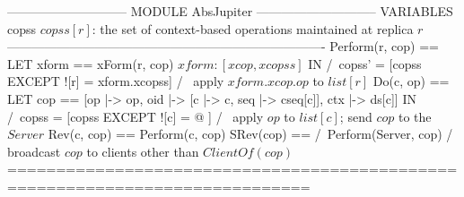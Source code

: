 \documentclass[preview, border={5pt 0pt 5pt 1pt}]{standalone}
\begin{document}
\begin{tla}
----------------------------- MODULE AbsJupiter -----------------------------
VARIABLES copss \* $copss[r]$: the set of context-based operations maintained at replica $r$
----------------------------------------------------------------------------
Perform(r, cop) == LET xform == xForm(r, cop) \* $xform: [xcop, xcopss]$
                   IN  /\ copss' = [copss EXCEPT ![r] = xform.xcopss]
                       /\ \* apply $xform.xcop.op$ to $list[r]$
Do(c, op) == LET cop == [op |-> op, oid |-> [c |-> c, seq |-> cseq[c]], ctx |-> ds[c]]
             IN  /\ copss = [copss EXCEPT ![c] = @ ]
                 /\ \* apply $op$ to $list[c]$; send $cop$ to the $Server$
Rev(c, cop) == Perform(c, cop)
SRev(cop) == /\ Perform(Server, cop)
             /\ \* broadcast $cop$ to clients other than $ClientOf(cop)$
=============================================================================
\end{tla}
\begin{tlatex}
\@x{}\moduleLeftDash{}\moduleRightDash\@xx{}%
%
%
\@xx{}%
\@x{}\midbar\@xx{}%
%
\@xx{}%
%
%
\@xx{}%
%
%
\@xx{}%
%
%
%
%
\@xx{}%
\@x{}\bottombar\@xx{}%
\end{tlatex}
\end{document}

